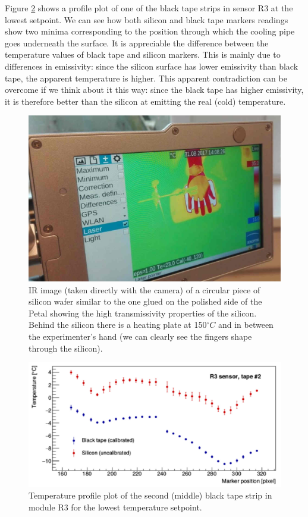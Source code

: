 		Figure \ref{fig4.5} shows a profile plot of one of the black tape strips in sensor R3 at the lowest setpoint. We can see how both silicon and black tape markers readings show two minima corresponding to the position through which the cooling pipe goes underneath the surface. It is appreciable the difference between the temperature values of black tape and silicon markers. This is mainly due to differences in emissivity: since the silicon surface has lower emissivity than black tape, the apparent temperature is higher. This apparent contradiction can be overcome if we think about it this way: since the black tape has higher emissivity, it is therefore better than the silicon at emitting the real (cold) temperature.
		
		\begin{figure}[ht!]
			\centering
			\captionsetup{justification=centering,margin=2cm}
			\includegraphics[scale=0.35]{Figures/Chapter04/HandTransmission.jpg}
			\caption{IR image (taken directly with the camera) of a circular piece of silicon wafer similar to the one glued on the polished side of the Petal showing the high transmissivity properties of the silicon. Behind the silicon there is a heating plate at 150\space$^\circ C$ and in between the experimenter’s hand (we can clearly see the fingers shape through the silicon).}\label{fig4.4}
		\end{figure}
		
		\begin{figure}[ht!]
			\centering
			\captionsetup{justification=centering,margin=2cm}
			\includegraphics[scale=0.35]{Figures/Chapter04/R3Profile_Si_and_BT.jpg}
			\caption{Temperature profile plot of the second (middle) black tape strip in module R3 for the lowest temperature setpoint.}\label{fig4.5}
		\end{figure}
		
